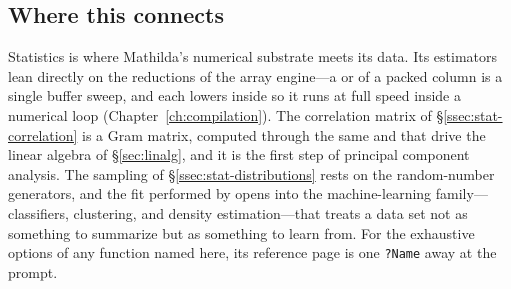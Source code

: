 
\subsection*{Where this connects}

Statistics is where Mathilda's numerical substrate meets its data. Its estimators
lean directly on the reductions of the array engine---a  or 
of a packed column is a single buffer sweep, and each lowers inside  so
it runs at full speed inside a numerical loop (Chapter~\ref{ch:compilation}). The
correlation matrix of \S\ref{ssec:stat-correlation} is a Gram matrix, computed
through the same  and  that drive the linear algebra of
\S\ref{sec:linalg}, and it is the first step of principal component analysis. The
sampling of \S\ref{ssec:stat-distributions} rests on the random-number generators,
and the fit performed by  opens into the machine-learning
family---classifiers, clustering, and density estimation---that treats a data set
not as something to summarize but as something to learn from. For the exhaustive
options of any function named here, its reference page is one \texttt{?Name} away
at the prompt.
